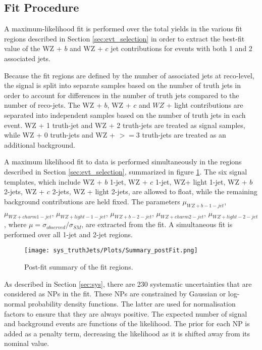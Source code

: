 
\subsection{Fit Procedure}
\label{sec:fit}

A maximum-likelihood fit is performed over the total yields in the various fit regions described in Section \ref{sec:evt_selection} in order to extract the best-fit value of the WZ + $b$ and WZ + $c$ jet contributions for events with both 1 and 2 associated jets.

Because the fit regions are defined by the number of associated jets at reco-level, the signal is split into separate samples based on the number of truth jets in order to account for differences in the number of truth jets compared to the number of reco-jets. The WZ + $b$, WZ + $c$ and $WZ$ + light contributions are separated into independent samples based on the number of truth jets in each event. WZ + 1 truth-jet and WZ + 2 truth-jets are treated as signal samples, while WZ + 0 truth-jets and WZ + $>=$3 truth-jets are treated as an additional background. 

A maximum likelihood fit to data is performed simultaneously in the regions described in Section \ref{sec:evt_selection}, summarized in figure \ref{fig:summary}. The six signal templates, which include WZ + $b$ 1-jet, WZ + $c$ 1-jet, WZ+ light 1-jet, WZ + $b$ 2-jets, WZ + $c$ 2-jets, WZ + light 2-jets, are allowed to float, while the remaining background contributions are held fixed. The parameters $\mu_{WZ+b - 1-jet}$, $\mu_{WZ+charm 1-jet}$, $\mu_{WZ+light - 1-jet}$, $\mu_{WZ+b - 2-jet}$, $\mu_{WZ+charm 2-jet}$, $\mu_{WZ+light - 2-jet}$, where $\mu = \sigma_{observed}/\sigma_{SM} $, are extracted from the fit. A simultaneous fit is performed over all 1-jet and 2-jet regions.

\begin{figure}[H]
  \center                                                                                                                    
  \texttt{[image: sys\_truthJets/Plots/Summary\_postFit.png]}
  \caption{Post-fit summary of the fit regions.}
  \label{fig:summary}
\end{figure}

As described in Section \ref{sec:sys}, there are 230 systematic uncertainties that are considered as NPs in the fit. These NPs are constrained by Gaussian or log-normal probability density functions. The latter are used for normalisation factors to ensure that they are always positive. The expected number of signal and background events are functions of the likelihood. The prior for each NP is added as a penalty term, decreasing the likelihood as it is shifted away from its nominal value.

